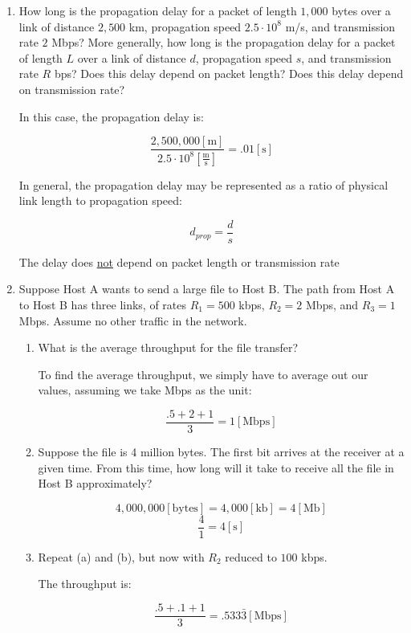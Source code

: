 \begin{enumerate}
  \item How long is the propagation delay for a packet of length $1,000$ bytes over a link of distance $2,500$ km, propagation speed $2.5\cdot10^8$ m/s, and transmission rate $2$ Mbps? More generally, how long is the propagation delay for a packet of length $L$ over a link of distance $d$, propagation speed $s$, and transmission rate $R$ bps? Does this delay depend on packet length?  Does this delay depend on transmission rate?

    In this case, the propagation delay is:

    $$\frac{2,500,000[\si{\meter}]}{2.5\cdot10^{8}\left[ \frac{\si{\meter}}{\si{\second}} \right]}=.01[\si{\second}]$$

    In general, the propagation delay may be represented as a ratio of physical link length to propagation speed:

    $$d_{prop}=\frac{d}{s}$$

    The delay does \underline{not} depend on packet length or transmission rate

  \item Suppose Host A wants to send a large file to Host B. The path from Host A to Host B has three links, of rates $R_1=500$ kbps, $R_2=2$ Mbps, and $R_3=1$ Mbps. Assume no other traffic in the network.

    \begin{enumerate}

      \item What is the average throughput for the file transfer?

        To find the average throughput, we simply have to average out our values, assuming we take Mbps as the unit:

        $$\frac{.5 + 2 + 1}{3}=1[\text{Mbps}]$$

      \item Suppose the file is 4 million bytes. The first bit arrives at the receiver at a given time. From this time, how long will it take to receive all the file in Host B approximately?

        $$4,000,000[\text{bytes}]=4,000[\text{kb}]=4[\text{Mb}]$$
        $$\frac{4}{1}=4[\si{\second}]$$

      \item Repeat (a) and (b), but now with $R_2$ reduced to $100$ kbps.

        The throughput is:

        $$\frac{.5+.1+1}{3}=.533\bar{3}[\text{Mbps}]$$


\end{enumerate}
\end{enumerate}
